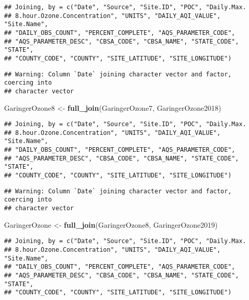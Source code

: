 \documentclass[
]{article}
\newenvironment{Shaded}{\begin{snugshade}}{\end{snugshade}}
\newcommand{\KeywordTok}[1]{\textcolor[rgb]{0.13,0.29,0.53}{\textbf{#1}}}
\newcommand{\NormalTok}[1]{#1}
\newcommand{\StringTok}[1]{\textcolor[rgb]{0.31,0.60,0.02}{#1}}
\begin{document}
\begin{verbatim}
## Joining, by = c("Date", "Source", "Site.ID", "POC", "Daily.Max.
## 8.hour.Ozone.Concentration", "UNITS", "DAILY_AQI_VALUE", "Site.Name",
## "DAILY_OBS_COUNT", "PERCENT_COMPLETE", "AQS_PARAMETER_CODE",
## "AQS_PARAMETER_DESC", "CBSA_CODE", "CBSA_NAME", "STATE_CODE", "STATE",
## "COUNTY_CODE", "COUNTY", "SITE_LATITUDE", "SITE_LONGITUDE")
\end{verbatim}

\begin{verbatim}
## Warning: Column `Date` joining character vector and factor, coercing into
## character vector
\end{verbatim}

\begin{Shaded}
\begin{Highlighting}[]
\NormalTok{GaringerOzone8 <-}\StringTok{ }\KeywordTok{full_join}\NormalTok{(GaringerOzone7, GaringerOzone2018)}
\end{Highlighting}
\end{Shaded}

\begin{verbatim}
## Joining, by = c("Date", "Source", "Site.ID", "POC", "Daily.Max.
## 8.hour.Ozone.Concentration", "UNITS", "DAILY_AQI_VALUE", "Site.Name",
## "DAILY_OBS_COUNT", "PERCENT_COMPLETE", "AQS_PARAMETER_CODE",
## "AQS_PARAMETER_DESC", "CBSA_CODE", "CBSA_NAME", "STATE_CODE", "STATE",
## "COUNTY_CODE", "COUNTY", "SITE_LATITUDE", "SITE_LONGITUDE")
\end{verbatim}

\begin{verbatim}
## Warning: Column `Date` joining character vector and factor, coercing into
## character vector
\end{verbatim}

\begin{Shaded}
\begin{Highlighting}[]
\NormalTok{GaringerOzone <-}\StringTok{ }\KeywordTok{full_join}\NormalTok{(GaringerOzone8, GaringerOzone2019)}
\end{Highlighting}
\end{Shaded}

\begin{verbatim}
## Joining, by = c("Date", "Source", "Site.ID", "POC", "Daily.Max.
## 8.hour.Ozone.Concentration", "UNITS", "DAILY_AQI_VALUE", "Site.Name",
## "DAILY_OBS_COUNT", "PERCENT_COMPLETE", "AQS_PARAMETER_CODE",
## "AQS_PARAMETER_DESC", "CBSA_CODE", "CBSA_NAME", "STATE_CODE", "STATE",
## "COUNTY_CODE", "COUNTY", "SITE_LATITUDE", "SITE_LONGITUDE")
\end{verbatim}
\end{document}
